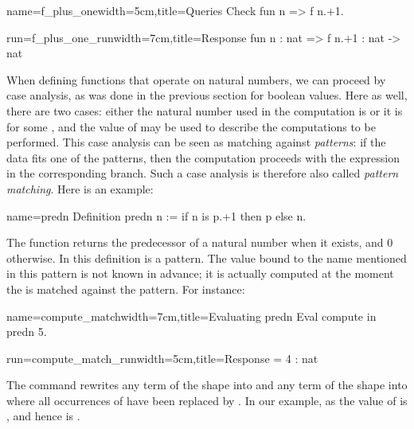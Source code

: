 \begin{coq}{name=f_plus_one}{width=5cm,title=Queries}
Check fun n => f n.+1.
\end{coq}
\begin{coqout}{run=f_plus_one_run}{width=7cm,title=Response}
fun n : nat => f n.+1 : nat -> nat
\end{coqout}

When defining functions that operate on natural numbers, we can
proceed by case analysis, as was done in the previous section for boolean
values. Here as well, there are two cases: either the natural number used in
the computation is  or it is  for
some , and the value of  may be used to describe the
computations to be performed. This case analysis can be seen as
matching against \emph{patterns}: if the data fits one of
the patterns, then the computation proceeds with the expression in the
corresponding branch.  Such a case analysis is therefore also called
\emph{pattern matching}. Here is an example:

\begin{coq}{name=predn}{}
Definition predn n := if n is p.+1 then p else n.
\end{coq}

The function  returns the predecessor of a natural number
when it exists, and 0 otherwise. In this definition  is a
pattern. The value bound to the name  mentioned in this pattern is not
known in advance; it is actually computed at the moment the  is matched
against the pattern. For instance:

\begin{coq}{name=compute_match}{width=7cm,title=Evaluating predn}
Eval compute in predn 5.
\end{coq}
\begin{coqout}{run=compute_match_run}{width=5cm,title=Response}
= 4 : nat
\end{coqout}

The  command rewrites any term of the shape
 into  and any term of the shape
 into  where all occurrences of
 have been replaced by . In our example, as the value of
 is ,  and hence  is .


